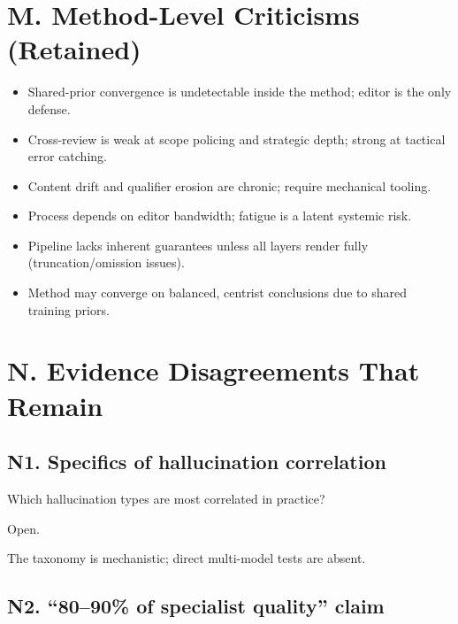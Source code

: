 \documentclass[11pt,letterpaper]{article}
\begin{document}
\section{M. Method-Level Criticisms (Retained)}

\begin{itemize}[nosep]
  \item Shared-prior convergence is undetectable inside the method; editor is the only defense.
  \item Cross-review is weak at scope policing and strategic depth; strong at tactical error catching.
  \item Content drift and qualifier erosion are chronic; require mechanical tooling.
  \item Process depends on editor bandwidth; fatigue is a latent systemic risk.
  \item Pipeline lacks inherent guarantees unless all layers render fully (truncation/omission issues).
  \item Method may converge on balanced, centrist conclusions due to shared training priors.
\end{itemize}

\section{N. Evidence Disagreements That Remain}

\subsection{N1. Specifics of hallucination correlation}

\begin{reflist}
\item[Dispute:] Which hallucination types are most correlated in practice?
\item[Status:] Open.
\item[Evidence:] The taxonomy is mechanistic; direct multi-model tests are absent.
\end{reflist}

\subsection{N2. ``80--90\% of specialist quality'' claim}
\end{document}
